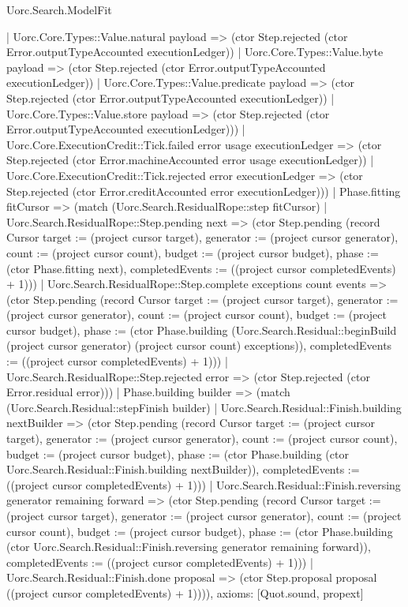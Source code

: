 \begin{lexlean}{Uorc.Search.ModelFit}
\begin{semanticmodule}
{        | Uorc.Core.Types::Value.natural payload => (ctor Step.rejected (ctor Error.outputTypeAccounted executionLedger))
        | Uorc.Core.Types::Value.byte payload => (ctor Step.rejected (ctor Error.outputTypeAccounted executionLedger))
        | Uorc.Core.Types::Value.predicate payload => (ctor Step.rejected (ctor Error.outputTypeAccounted executionLedger))
        | Uorc.Core.Types::Value.store payload => (ctor Step.rejected (ctor Error.outputTypeAccounted executionLedger)))
      | Uorc.Core.ExecutionCredit::Tick.failed error usage executionLedger => (ctor Step.rejected (ctor Error.machineAccounted error usage executionLedger))
      | Uorc.Core.ExecutionCredit::Tick.rejected error executionLedger => (ctor Step.rejected (ctor Error.creditAccounted error executionLedger)))
    | Phase.fitting fitCursor => (match (Uorc.Search.ResidualRope::step fitCursor)
      | Uorc.Search.ResidualRope::Step.pending next => (ctor Step.pending (record Cursor {target := (project cursor target), generator := (project cursor generator), count := (project cursor count), budget := (project cursor budget), phase := (ctor Phase.fitting next), completedEvents := ((project cursor completedEvents) + 1)}))
      | Uorc.Search.ResidualRope::Step.complete exceptions count events => (ctor Step.pending (record Cursor {target := (project cursor target), generator := (project cursor generator), count := (project cursor count), budget := (project cursor budget), phase := (ctor Phase.building (Uorc.Search.Residual::beginBuild (project cursor generator) (project cursor count) exceptions)), completedEvents := ((project cursor completedEvents) + 1)}))
      | Uorc.Search.ResidualRope::Step.rejected error => (ctor Step.rejected (ctor Error.residual error)))
    | Phase.building builder => (match (Uorc.Search.Residual::stepFinish builder)
      | Uorc.Search.Residual::Finish.building nextBuilder => (ctor Step.pending (record Cursor {target := (project cursor target), generator := (project cursor generator), count := (project cursor count), budget := (project cursor budget), phase := (ctor Phase.building (ctor Uorc.Search.Residual::Finish.building nextBuilder)), completedEvents := ((project cursor completedEvents) + 1)}))
      | Uorc.Search.Residual::Finish.reversing generator remaining forward => (ctor Step.pending (record Cursor {target := (project cursor target), generator := (project cursor generator), count := (project cursor count), budget := (project cursor budget), phase := (ctor Phase.building (ctor Uorc.Search.Residual::Finish.reversing generator remaining forward)), completedEvents := ((project cursor completedEvents) + 1)}))
      | Uorc.Search.Residual::Finish.done proposal => (ctor Step.proposal proposal ((project cursor completedEvents) + 1)))),
  axioms: [Quot.sound, propext]
}


\end{semanticmodule}
\end{lexlean}
